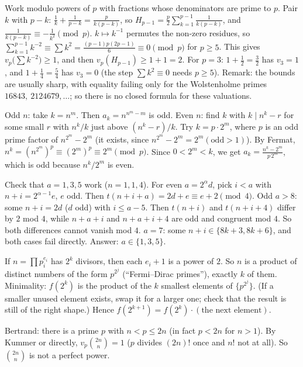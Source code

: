\documentclass[11pt,a4paper]{article}
\begin{document}
 Work modulo powers of $p$ with fractions whose denominators are prime to $p$. Pair $k$ with $p-k$: $\frac1k+\frac1{p-k}=\frac p{k(p-k)}$, so $H_{p-1}=\frac p2\sum_{k=1}^{p-1}\frac1{k(p-k)}$, and $\frac1{k(p-k)}\equiv-\frac1{k^2}\pmod p$.
 $k\mapsto k^{-1}$ permutes the non-zero residues, so $\sum_{k=1}^{p-1}k^{-2}\equiv\sum k^2=\frac{(p-1)p(2p-1)}6\equiv0\pmod p$ for $p\ge5$. This gives $v_p\bigl(\sum k^{-2}\bigr)\ge1$, and then $v_p(H_{p-1})\ge1+1=2$.
 For $p=3$: $1+\frac12=\frac32$ has $v_3=1$, and $1+\frac14=\frac54$ has $v_3=0$ (the step $\sum k^2\equiv0$ needs $p\ge5$). Remark: the bounds are usually sharp, with equality failing only for the Wolstenholme primes $16843,\ 2124679,\dots$; so there is no closed formula for these valuations.

 Odd $n$: take $k=n^m$. Then $a_k=n^{n^m-m}$ is odd.
 Even $n$: find $k$ with $k\mid n^k-r$ for some small $r$ with $n^k/k$ just above $(n^k-r)/k$. Try $k=p\cdot2^m$, where $p$ is an odd prime factor of $n^{2^m}-2^m$ (it exists, since $n^{2^m}-2^m=2^m(\text{odd}>1)$).
 By Fermat, $n^k=(n^{2^m})^p\equiv(2^m)^p\equiv2^m\pmod p$. Since $0<2^m<k$, we get $a_k=\frac{n^k-2^m}{p\,2^m}$, which is odd because $n^k/2^m$ is even.

 Check that $a=1,3,5$ work ($n=1,1,4$). For even $a=2^\alpha d$, pick $i<a$ with $n+i=2^{\alpha-1}e$, $e$ odd. Then $t(n+i+a)=2d+e\equiv e+2\pmod 4$.
 Odd $a>8$: some $n+i=2d$ ($d$ odd) with $i\le a-5$. Then $t(n+i)$ and $t(n+i+4)$ differ by $2$ mod $4$, while $n+a+i$ and $n+a+i+4$ are odd and congruent mod $4$. So both differences cannot vanish mod $4$.
 $a=7$: some $n+i\in\{8k+3,8k+6\}$, and both cases fail directly. Answer: $a\in\{1,3,5\}$.

 If $n=\prod p_i^{e_i}$ has $2^k$ divisors, then each $e_i+1$ is a power of $2$. So $n$ is a product of distinct numbers of the form $p^{2^j}$ (``Fermi--Dirac primes''), exactly $k$ of them.
 Minimality: $f(2^k)$ is the product of the $k$ smallest elements of $\{p^{2^j}\}$. (If a smaller unused element exists, swap it for a larger one; check that the result is still of the right shape.)
 Hence $f(2^{k+1})=f(2^k)\cdot(\text{the next element})$.

 Bertrand: there is a prime $p$ with $n<p\le2n$ (in fact $p<2n$ for $n>1$).
 By Kummer or directly, $v_p\binom{2n}n=1$ ($p$ divides $(2n)!$ once and $n!$ not at all). So $\binom{2n}{n}$ is not a perfect power.
\end{document}
